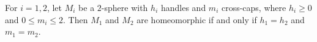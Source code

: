 For $i = 1, 2$, let $M_i$ be a $2$-sphere with $h_i$ handles and $m_i$ cross-caps, where $h_i \geqslant 0$ and $0 \leqslant m_i \leqslant 2$. Then $M_1$ and $M_2$ are homeomorphic if and only if $h_1 = h_2$ and $m_1 = m_2$.
